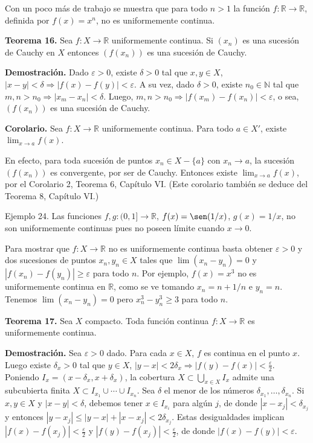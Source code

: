 \documentclass[12pt,oneside]{book}
\begin{document}
Con un poco más de trabajo se muestra que para todo \(n > 1\) la función \(f: \mathbb{R} \to \mathbb{R}\), definida por \(f(x) = x^n\), no es uniformemente continua.

\textbf{Teorema 16.} Sea \(f: X \to \mathbb{R}\) uniformemente continua. Si \((x_n)\) es una sucesión de Cauchy en \(X\) entonces \((f(x_n))\) es una sucesión de Cauchy.

\textbf{Demostración.} Dado \(\varepsilon > 0\), existe \(\delta > 0\) tal que \(x, y \in X\), \(|x - y| < \delta \Rightarrow |f(x) - f(y)| < \varepsilon\). A su vez, dado \(\delta > 0\), existe \(n_0 \in \mathbb{N}\) tal que \(m, n > n_0 \Rightarrow |x_m - x_n| < \delta\). Luego, \(m, n > n_0 \Rightarrow |f(x_m) - f(x_n)| < \varepsilon\), o sea, \((f(x_n))\) es una sucesión de Cauchy.

\textbf{Corolario.} Sea \(f: X \to \mathbb{R}\) uniformemente continua. Para todo \(a \in X'\), existe \(\lim_{x \to a} f(x)\).

En efecto, para toda sucesión de puntos \(x_n \in X - \{a\}\) con \(x_n \to a\), la sucesión \((f(x_n))\) es convergente, por ser de Cauchy. Entonces existe \(\lim_{x \to a} f(x)\), por el Corolario 2, Teorema 6, Capítulo VI. (Este corolario también se deduce del Teorema 8, Capítulo VI.)

Ejemplo 24. Las funciones \(f, g: (0, 1] \to \mathbb{R}\), \(f(x) = \sen(1/x)\), \(g(x) = 1/x\), no son uniformemente continuas pues no poseen límite cuando \(x \to 0\).

Para mostrar que \(f: X \to \mathbb{R}\) no es uniformemente continua basta obtener \(\varepsilon > 0\) y dos sucesiones de puntos \(x_n, y_n \in X\) tales que \(\lim(x_n - y_n) = 0\) y \(|f(x_n) - f(y_n)| \geq \varepsilon\) para todo \(n\). Por ejemplo, \(f(x) = x^3\) no es uniformemente continua en \(\mathbb{R}\), como se ve tomando \(x_n = n + 1/n\) e \(y_n = n\). Tenemos \(\lim(x_n - y_n) = 0\) pero \(x_n^3 - y_n^3 \geq 3\) para todo \(n\).

\textbf{Teorema 17.} Sea \(X\) compacto. Toda función continua \(f: X \to \mathbb{R}\) es uniformemente continua.

\textbf{Demostración.} Sea \(\varepsilon > 0\) dado. Para cada \(x \in X\), \(f\) es continua en el punto \(x\). Luego existe \(\delta_x > 0\) tal que \(y \in X\), \(|y - x| < 2\delta_x \Rightarrow |f(y) - f(x)| < \frac{\varepsilon}{2}\). Poniendo \(I_x = (x - \delta_x, x + \delta_x)\), la cobertura \(X \subset \bigcup_{x \in X} I_x\) admite una subcubierta finita \(X \subset I_{x_1} \cup \cdots \cup I_{x_n}\). Sea \(\delta\) el menor de los números \(\delta_{x_1}, \ldots, \delta_{x_n}\). Si \(x, y \in X\) y \(|x - y| < \delta\), debemos tener \(x \in I_{x_i}\) para algún \(j\), de donde \(|x - x_j| < \delta_{x_j}\) y entonces \(|y - x_j| \leq |y - x| + |x - x_j| < 2\delta_{x_j}\). Estas desigualdades implican \(|f(x) - f(x_j)| < \frac{\varepsilon}{2}\) y \(|f(y) - f(x_j)| < \frac{\varepsilon}{2}\), de donde \(|f(x) - f(y)| < \varepsilon\).
\end{document}
